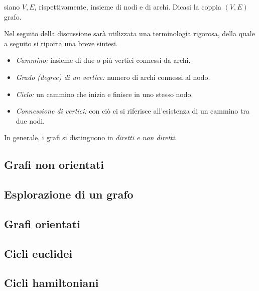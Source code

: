 \documentclass{subfiles}
\begin{document}
\begin{Definition*}
    siano \(V, E\), rispettivamente, insieme di nodi e di archi. Dicasi la coppia \((V, E)\) grafo.
\end{Definition*}

Nel seguito della discussione sarà utilizzata una terminologia rigorosa, della quale a seguito si riporta una breve sintesi.
\begin{itemize}
    \item \emph{Cammino:} insieme di due o più vertici connessi da archi.
    \item \emph{Grado (degree) di un vertice:} numero di archi connessi al nodo.
    \item \emph{Ciclo:} un cammino che inizia e finisce in uno stesso nodo.
    \item \emph{Connessione di vertici:} con ciò ci si riferisce all'esistenza di un cammino tra due nodi.
\end{itemize}

In generale, i grafi si distinguono in \emph{diretti \emph{e} non diretti}.

\subsection{Grafi non orientati}


\subsection{Esplorazione di un grafo}

\clearpage

\subsection{Grafi orientati}


\subsection{Cicli euclidei}


\subsection{Cicli hamiltoniani}

\end{document}
